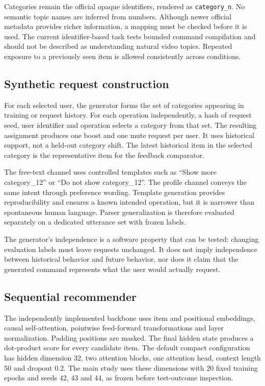 \documentclass[conference]{IEEEtran}
\begin{document}
Categories remain the official opaque identifiers, rendered as \texttt{category\_n}. No semantic topic names are inferred from numbers. Although newer official metadata provides richer information, a mapping must be checked before it is used. The current identifier-based task tests bounded command compilation and should not be described as understanding natural video topics. Repeated exposure to a previously seen item is allowed consistently across conditions.

\subsection{Synthetic request construction}
For each selected user, the generator forms the set of categories appearing in training or request history. For each operation independently, a hash of request seed, user identifier and operation selects a category from that set. The resulting assignment produces one boost and one mute request per user. It uses historical support, not a held-out category shift. The latest historical item in the selected category is the representative item for the feedback comparator.

The free-text channel uses controlled templates such as ``Show more category\_12'' or ``Do not show category\_12''. The profile channel conveys the same intent through preference wording. Template generation provides reproducibility and ensures a known intended operation, but it is narrower than spontaneous human language. Parser generalization is therefore evaluated separately on a dedicated utterance set with frozen labels.

The generator's independence is a software property that can be tested: changing evaluation labels must leave requests unchanged. It does not imply independence between historical behavior and future behavior, nor does it claim that the generated command represents what the user would actually request.

\subsection{Sequential recommender}
The independently implemented backbone uses item and positional embeddings, causal self-attention, pointwise feed-forward transformations and layer normalization. Padding positions are masked. The final hidden state produces a dot-product score for every candidate item. The default compact configuration has hidden dimension 32, two attention blocks, one attention head, context length 50 and dropout 0.2. The main study uses these dimensions with 20 fixed training epochs and seeds 42, 43 and 44, as frozen before test-outcome inspection.
\end{document}
